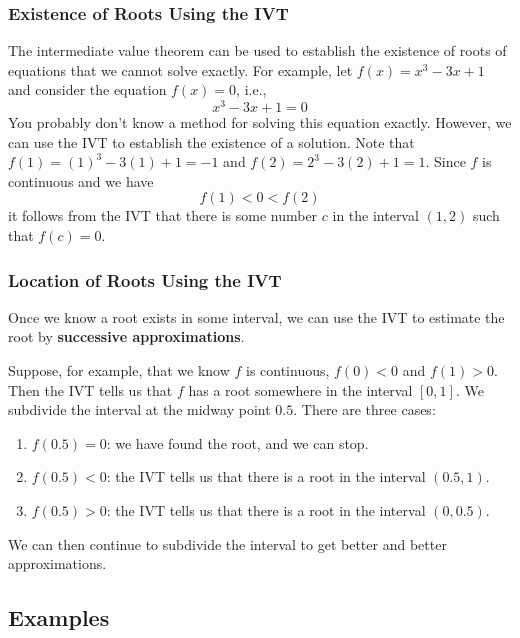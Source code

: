 \documentclass[serif,ignorenonframetext]{beamer}
\begin{document}
\begin{frame}
  \frametitle{Existence of Roots Using the IVT}
  The intermediate value theorem can be used to establish the existence
  of roots of equations that we cannot solve exactly.
  \pause
  For example, let $f(x)=x^3-3x+1$ and consider the equation $f(x)=0$, i.e.,
  \begin{displaymath}
    x^3-3x+1 = 0
  \end{displaymath}
  \pause
  You probably don't know a method for solving this equation exactly.
  However, we can use the IVT to establish the existence of a solution.
  \pause
  Note that $f(1)=(1)^3-3(1)+1=-1$ and $f(2)=2^3-3(2)+1=1$.  Since $f$
  is continuous and we have
  \begin{displaymath}
    f(1) < 0 < f(2)
  \end{displaymath}
  it follows from the IVT that there is some number $c$ in the interval
  $(1,2)$ such that $f(c)=0$.
\end{frame}

\begin{frame}
  \frametitle{Location of Roots Using the IVT}
  Once we know a root exists in some interval, we can 
  use the IVT to estimate the root by \textbf{successive
  approximations}.
  \pause

  Suppose, for example, that we know $f$ is continuous,
  $f(0)<0$ and $f(1)>0$.  
  \pause
  Then
  the IVT tells us that $f$ has a root somewhere
  in the interval $[0,1]$.  
  \pause
  We subdivide the interval at the midway point
  $0.5$.  There are three cases:
  \begin{enumerate}
  \pause
  \item $f(0.5)=0$: we have found the root, and we can stop.
  \pause
  \item $f(0.5)<0$: the IVT tells us that there is a root in the interval
    $(0.5,1)$.  
  \pause
  \item $f(0.5)>0$: the IVT tells us that there is a root in the interval
    $(0,0.5)$.
  \end{enumerate}
  \pause
  We can then continue to subdivide the interval to get better and better
  approximations.
\end{frame}


\subsection{Examples}
\end{document}

